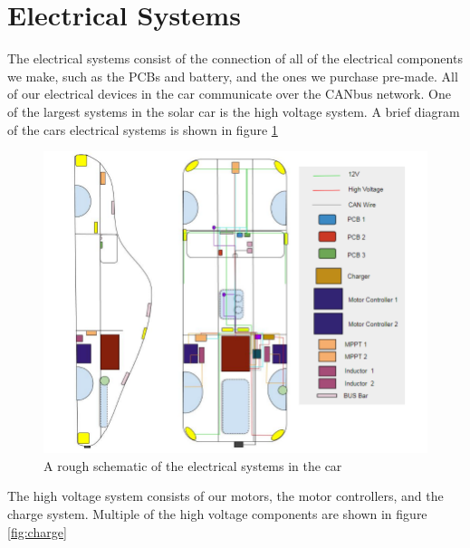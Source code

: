 \documentclass[titlepage]{article}
\begin{document}
    \section{Electrical Systems}
    The electrical systems consist of the connection of all of the
    electrical components we make, such as the PCBs and battery, and the
    ones we purchase pre-made. All of our electrical devices in the car
    communicate over the CANbus network. One of the largest systems in
    the solar car is the high voltage system. A brief diagram of the
    cars electrical systems is shown in figure \ref{fig:systems}
    \begin{figure}[H]
        \centering
        \includegraphics[width=\textwidth]{images/AllWiring.png}
        \caption{A rough schematic of the electrical systems in the car}
        \label{fig:systems}
    \end{figure}
    The high voltage system consists of our motors, the motor
    controllers, and the charge system. Multiple of the high voltage
    components are shown in figure \ref{fig:charge}
\end{document}
